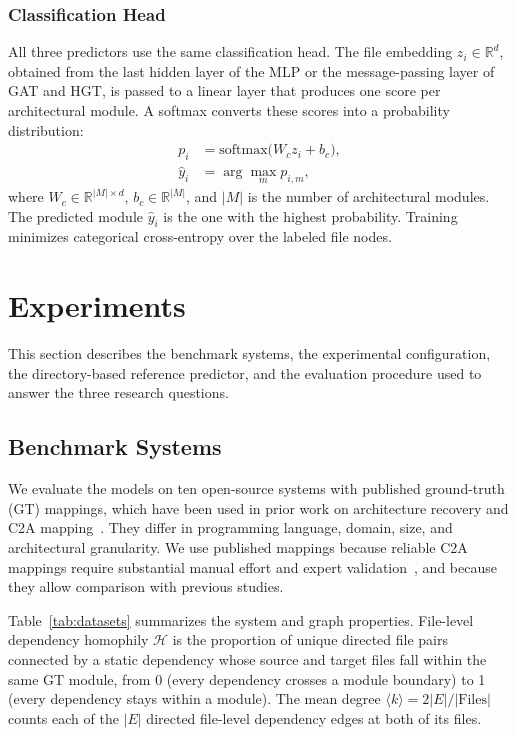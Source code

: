 \subsubsection{Classification Head\label{sec:head}}
All three predictors use the same classification head. The file embedding $z_i \in \mathbb{R}^{d}$, obtained from the last hidden layer of the MLP or the message-passing layer of GAT and HGT, is passed to a linear layer that produces one score per architectural module. A softmax converts these scores into a probability distribution:
\begin{equation}
\label{eq:head}
\begin{aligned}
p_i &= \text{softmax}\big(W_c z_i + b_c\big), \\
\hat{y}_i &= \arg\max_m p_{i,m},
\end{aligned}
\end{equation}
where $W_c \in \mathbb{R}^{|M| \times d}$, $b_c \in \mathbb{R}^{|M|}$, and $|M|$ is the number of architectural modules. The predicted module $\hat{y}_i$ is the one with the highest probability. Training minimizes categorical cross-entropy over the labeled file nodes.
\section{Experiments}
This section describes the benchmark systems, the experimental configuration, the directory-based reference predictor, and the evaluation procedure used to answer the three research questions.

\subsection{Benchmark Systems\label{sec:benchmark_systems}}

We evaluate the models on ten open-source systems with published ground-truth (GT) mappings, which have been used in prior work on architecture recovery and C2A mapping~\cite{gaer,olsson2022automatically}. They differ in programming language, domain, size, and architectural granularity. We use published mappings because reliable C2A mappings require substantial manual effort and expert validation~\cite{garcia2013}, and because they allow comparison with previous studies.

Table~\ref{tab:datasets} summarizes the system and graph properties. File-level dependency homophily $\mathcal{H}$ is the proportion of unique directed file pairs connected by a static dependency whose source and target files fall within the same GT module, from 0 (every dependency crosses a module boundary) to 1 (every dependency stays within a module). The mean degree $\langle k \rangle = 2|E|/|\text{Files}|$ counts each of the $|E|$ directed file-level dependency edges at both of its files.
 
